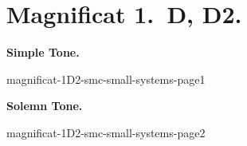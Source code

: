 {
\cleartoleftpage{}
\thispagestyle{empty}
\newcommand{\printsimpletone}{
\needspace{3\baselineskip}
\begin{center}\textbf{Simple Tone.}\end{center}
\vspace{0ex plus 0ex minus 2ex}
}
\newcommand{\printsolemntone}{
\needspace{3\baselineskip}
\begin{center}\textbf{Solemn Tone.}\end{center}
\vspace{0ex plus 0ex minus 1ex}
}

\label{magnificat-1D}
\vspace*{-\headheight}
\vspace*{-0.5\baselineskip}
\section{Magnificat 1.~D, D2.}

\vspace{-\baselineskip}
\def\betweenLilyPondSystem#1{
  \ifnum#1>1
    \vfil\noindent
  \else
    \linebreak
  \fi
}
\newcommand{\includelilypond}[1]{
  \noindent
  {#1}
}
\def\magsolemn{F}
\def\magsmc{T}
\def\annot{\magtone.~\magend}
\def\greinitialformat#1{%
{\fontsize{50}{50}\selectfont #1}%
}
\printsimpletone{}
\begin{oddversesmagnificat}{\magtex}
\magverses
\end{oddversesmagnificat}


\vfill
\includelilypond{magnificat-1D2-smc-small-systems-page1}
\pagebreak


\def\magsolemn{T}
\let\magant=\undefined
\let\magantlinetwo=\undefined
\let\magtex=\undefined
\let\magverses=\undefined
\def\magsmc{T}
\def\annot{\magtone.~\magend}
\printsolemntone{}
\begin{oddversesmagnificat}{\magtex}
\magverses
\end{oddversesmagnificat}


\vfill
\includelilypond{magnificat-1D2-smc-small-systems-page2}
}